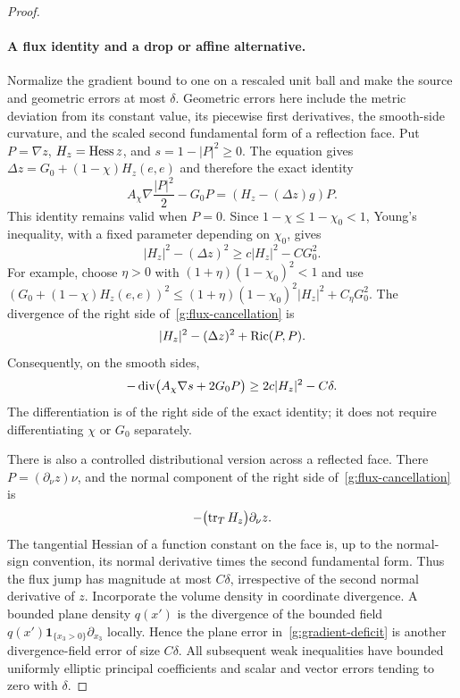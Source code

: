 \begin{proof}
\paragraph{A flux identity and a drop or affine alternative.}
Normalize the gradient bound to one on a rescaled unit ball and make the
source and geometric errors at most $\delta$.  Geometric errors here
include the metric deviation from its constant value, its piecewise first
derivatives, the smooth-side curvature, and the scaled second fundamental
form of a reflection face.  Put
$P=\nabla z$, $H_z=\operatorname{Hess} z$, and $s=1-|P|^2\geq0$.  The equation gives
$\Delta z=G_0+(1-\chi)H_z(e,e)$ and therefore the exact identity
\begin{equation}\label{g:flux-cancellation}
 A_\chi\nabla\frac{|P|^2}{2}-G_0P
          =(H_z-(\Delta z)g)P.
\end{equation}
This identity remains valid when $P=0$.  Since
$1-\chi\leq1-\chi_0<1$, Young's inequality, with a fixed parameter
depending on $\chi_0$, gives
\begin{equation}\label{g:hessian-coercivity}
 |H_z|^2-(\Delta z)^2\geq c|H_z|^2-CG_0^2.
\end{equation}
For example, choose $\eta>0$ with
$(1+\eta)(1-\chi_0)^2<1$ and use
$(G_0+(1-\chi)H_z(e,e))^2
 \leq(1+\eta)(1-\chi_0)^2|H_z|^2+C_\eta G_0^2$.
The divergence of the right side of~\eqref{g:flux-cancellation} is
\[
 |H_z|^2-(\Delta z)^2+\operatorname{Ric}(P,P).
\]
Consequently, on the smooth sides,
\begin{equation}\label{g:gradient-deficit}
 -\operatorname{div}\bigl(A_\chi\nabla s+2G_0P\bigr)
             \geq2c|H_z|^2-C\delta.
\end{equation}
The differentiation is of the right side of the exact identity;
it does not require differentiating $\chi$ or $G_0$ separately.

There is also a controlled distributional version across a reflected
face.  There $P=(\partial_\nu z)\nu$, and the normal component of the
right side of~\eqref{g:flux-cancellation} is
\[
 -\bigl(\operatorname{tr}_T H_z\bigr)\partial_\nu z.
\]
The tangential Hessian of a function constant on the face is, up to the
normal-sign convention, its normal derivative times the second fundamental
form.  Thus the flux jump has magnitude at most $C\delta$, irrespective
of the second normal derivative of $z$.  Incorporate the volume density
in coordinate divergence.  A bounded plane density $q(x')$ is the
divergence of the bounded field
$q(x')\mathbf1_{\{x_3>0\}}\partial_{x_3}$ locally.  Hence the plane
error in~\eqref{g:gradient-deficit} is another divergence-field error of
size $C\delta$.  All subsequent weak inequalities have bounded uniformly
elliptic principal coefficients and scalar and vector errors tending to
zero with $\delta$.


\end{proof}
